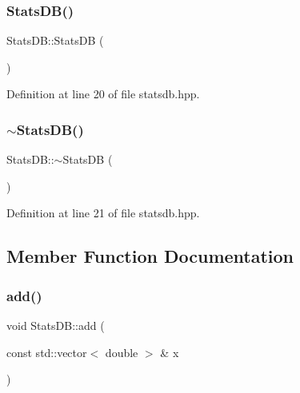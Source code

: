 \subsubsection{\texorpdfstring{Stats\+D\+B()}{StatsDB()}}
{\footnotesize\ttfamily Stats\+D\+B\+::\+Stats\+DB (\begin{DoxyParamCaption}{ }\end{DoxyParamCaption})\hspace{0.3cm}{\ttfamily [inline]}}



Definition at line 20 of file statsdb.\+hpp.

\mbox{\label{class_stats_d_b_ab4a9371d706b7418df5cb44e81fb5429}} 
\subsubsection{\texorpdfstring{$\sim$\+Stats\+D\+B()}{~StatsDB()}}
{\footnotesize\ttfamily Stats\+D\+B\+::$\sim$\+Stats\+DB (\begin{DoxyParamCaption}{ }\end{DoxyParamCaption})\hspace{0.3cm}{\ttfamily [inline]}}



Definition at line 21 of file statsdb.\+hpp.



\subsection{Member Function Documentation}
\mbox{\label{class_stats_d_b_a5759e17b759fcafeec7601188aaa8266}} 
\subsubsection{\texorpdfstring{add()}{add()}}
{\footnotesize\ttfamily void Stats\+D\+B\+::add (\begin{DoxyParamCaption}\item[{const std\+::vector$<$ double $>$ \&}]{x }\end{DoxyParamCaption})\hspace{0.3cm}{\ttfamily [inline]}}



